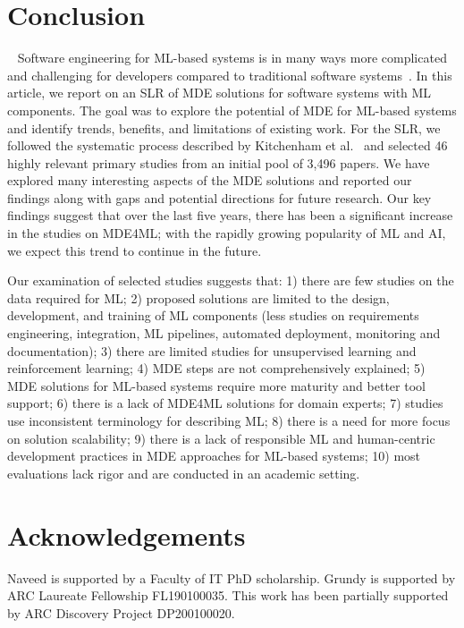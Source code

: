 


\section{Conclusion}~\label{sec:Conclusion}
Software engineering for ML-based systems is in many ways more complicated and challenging for developers compared to traditional software systems~\cite{atouani2021artifact}. In this article, we report on an SLR of MDE solutions for software systems with ML components. The goal was to explore the potential of MDE for ML-based systems and identify trends, benefits, and limitations of existing work. For the SLR, we followed the systematic process described by Kitchenham et al.~\cite{kitchenham2009systematic} and selected 46 highly relevant primary studies from an initial pool of 3,496 papers. We have explored many interesting aspects of the MDE solutions and reported our findings along with gaps and potential directions for future research. Our key findings suggest that over the last five years, there has been a significant increase in the studies on MDE4ML; with the rapidly growing popularity of ML and AI, we expect this trend to continue in the future. 

Our examination of selected studies suggests that: 1) there are few studies on the data required for ML; 2) proposed solutions are limited to the design, development, and training of ML components (less studies on requirements engineering, integration, ML pipelines, automated deployment, monitoring and documentation); 3) there are limited studies for unsupervised learning and reinforcement learning; 4) MDE steps are not comprehensively explained; 5) MDE solutions for ML-based systems require more maturity and better tool support; 6) there is a lack of MDE4ML solutions for domain experts; 7) studies use inconsistent terminology for describing ML; 8) there is a need for more focus on solution scalability; 9) there is a lack of responsible ML and human-centric development practices in MDE approaches for ML-based systems; 10) most evaluations lack rigor and are conducted in an academic setting.

\section*{Acknowledgements}

Naveed is supported by a Faculty of IT PhD scholarship. Grundy is supported by ARC Laureate Fellowship FL190100035. This work has been partially supported by ARC Discovery Project DP200100020.
